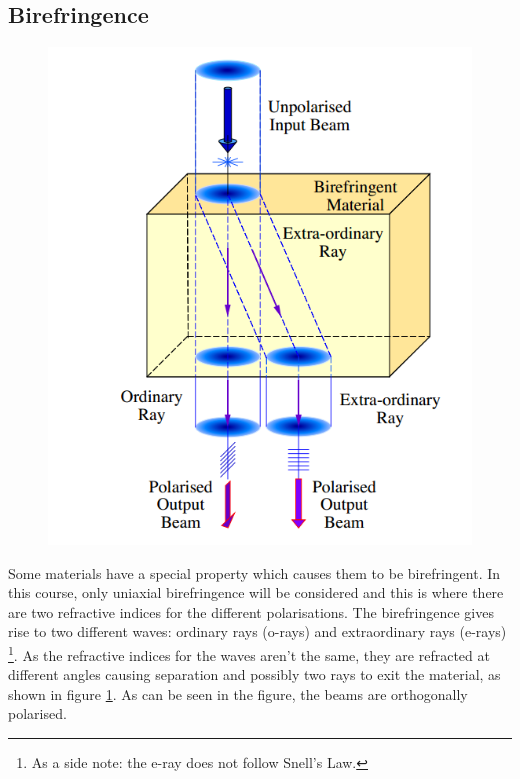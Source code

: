 \subsection{Birefringence}
\begin{minipage}{0.47\linewidth}
	\begin{figure} [H]
		\includegraphics[width=\linewidth,scale=0.7]{Photonics/birefr_eg}
		\label{fig:ItP:birefr_1}
	\end{figure}	
\end{minipage}
\begin{minipage}{0.47\linewidth}
	Some materials have a special property which causes them to be birefringent. 
	 In this course, only uniaxial birefringence will be considered and this is where there are two refractive indices for the different polarisations. 
	 The birefringence gives rise to two different waves: ordinary rays (o-rays) and extraordinary rays (e-rays) \footnote{As a side note: the e-ray does not follow Snell's Law.}.
	 As the refractive indices for the waves aren't the same, they are refracted at different angles causing separation and possibly two rays to exit the material, as shown in figure \ref{fig:ItP:birefr_1}.
	As can be seen in the figure, the beams are orthogonally polarised.
\end{minipage}

